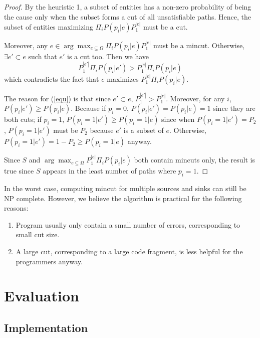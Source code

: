 \begin{proof}
By the heuristic 1, a subset of entities has a non-zero probability of being
the cause only when the subset forms a cut of all unsatisfiable paths. Hence,
the subset of entities maximizing $\Pi_i P(p_i|e) P_1^{|e|}$ must be a cut.

Moreover, any $e\in \arg\max_{e\subseteq \Omega}\Pi_i P(p_i|e) P_1^{|e|}$ must
be a mincut. Otherwise, $\exists e'\subset e$ such that $e'$ is a cut too. Then
we have
\begin{equation}
\label{equ}
P_1^{|e'|} \Pi_i P(p_i|e') > P_1^{|e|} \Pi_i P(p_i|e)
\end{equation}
which contradicts the fact that $e$ maximizes $P_1^{|e|} \Pi_i P(p_i|e)$.

The reason for (\ref{equ}) is that since $e'\subset e$, $P_1^{|e'|}>
P_1^{|e|}$. Moreover, for any $i$,  $P(p_i|e') \geq P(p_i|e)$. Because if
$p_i=0$, $P(p_i|e')=P(p_i|e)=1$ since they are both cuts; if $p_i=1$,
$P(p_i=1|e')\geq P(p_i=1|e)$ since when $P(p_i=1|e')=P_2$,
$P(p_i=1|e')$ must be $P_2$ because $e'$ is a subset of $e$.
Otherwise, $P(p_i=1|e')=1-P_2\geq P(p_i=1|e)$ anyway.

Since $S$ and $\arg\max_{e\subseteq \Omega}P_1^{|e|} \Pi_i P(p_i|e)$ both
contain mincuts only, the result is true since $S$ appears in the least
number of paths where $p_i=1$.
\end{proof}

In the worst case, computing mincut for multiple sources and sinks can
still be NP complete. However, we believe the algorithm is practical
for the following reasons:
\begin{enumerate}
\item Program usually only contain a small number of errors, corresponding to
small cut size.

\item A large cut, corresponding to a large code fragment, is
less helpful for the programmers anyway.
\end{enumerate}


\section{Evaluation}
\label{sec:evaluation}

\subsection{Implementation}

